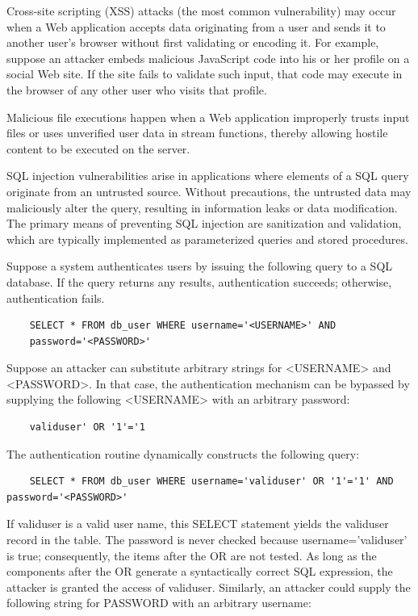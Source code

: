 Cross-site scripting (XSS) attacks (the most common vulnerability)
may occur when a Web application accepts data originating
from a user and sends it to another user's browser without
first validating or encoding it. For example, suppose an attacker
embeds malicious JavaScript code into his or her profile on a
social Web site. If the site fails to validate such input, that code
may execute in the browser of any other user who visits that
profile.

Malicious file executions happen when a Web application improperly trusts input files or uses unverified user data in stream functions, thereby allowing hostile content to be executed on the server.

SQL injection vulnerabilities arise in applications where elements of a SQL query originate from an untrusted source. Without precautions, the untrusted data may maliciously alter the query, resulting in information leaks or data modification. The primary means of preventing SQL injection are sanitization and validation, which are typically implemented as parameterized queries and stored procedures.

Suppose a system authenticates users by issuing the following query to a SQL database. If the query returns any results, authentication succeeds; otherwise, authentication fails.

\begin{lstlisting}
	SELECT * FROM db_user WHERE username='<USERNAME>' AND
	password='<PASSWORD>'
\end{lstlisting}

Suppose an attacker can substitute arbitrary strings for <USERNAME> and <PASSWORD>. In that case, the authentication mechanism can be bypassed by supplying the following <USERNAME> with an arbitrary password:

\begin{lstlisting}
	validuser' OR '1'='1
\end{lstlisting}

The authentication routine dynamically constructs the following query:

\begin{lstlisting}
	SELECT * FROM db_user WHERE username='validuser' OR '1'='1' AND password='<PASSWORD>'
\end{lstlisting}

If validuser is a valid user name, this SELECT statement yields the validuser record in the table. The password is never checked because username='validuser' is true; consequently, the items after the OR are not tested. As long as the components after the OR generate a syntactically correct SQL expression, the attacker is granted the access of validuser.
Similarly, an attacker could supply the following string for PASSWORD with an arbitrary username:

